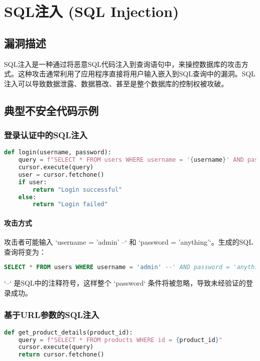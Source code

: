 \documentclass{article}
\begin{document}
\section{SQL注入 (SQL Injection)}

\subsection{漏洞描述}
SQL注入是一种通过将恶意SQL代码注入到查询语句中，来操控数据库的攻击方式。这种攻击通常利用了应用程序直接将用户输入嵌入到SQL查询中的漏洞。SQL注入可以导致数据泄露、数据篡改、甚至是整个数据库的控制权被攻破。

\subsection{典型不安全代码示例}

\subsubsection{登录认证中的SQL注入}
\begin{lstlisting}[language=Python, caption=存在SQL注入漏洞的登录代码]
def login(username, password):
    query = f"SELECT * FROM users WHERE username = '{username}' AND password = '{password}'"
    cursor.execute(query)
    user = cursor.fetchone()
    if user:
        return "Login successful"
    else:
        return "Login failed"
\end{lstlisting}

\paragraph{攻击方式}
攻击者可能输入 `username = 'admin' --` 和 `password = 'anything'`。生成的SQL查询将变为：
\begin{lstlisting}[language=SQL]
SELECT * FROM users WHERE username = 'admin' --' AND password = 'anything'
\end{lstlisting}
`--` 是SQL中的注释符号，这样整个 `password` 条件将被忽略，导致未经验证的登录成功。

\subsubsection{基于URL参数的SQL注入}
\begin{lstlisting}[language=Python, caption=URL参数导致的SQL注入]
def get_product_details(product_id):
    query = f"SELECT * FROM products WHERE id = {product_id}"
    cursor.execute(query)
    return cursor.fetchone()
\end{lstlisting}
\end{document}
